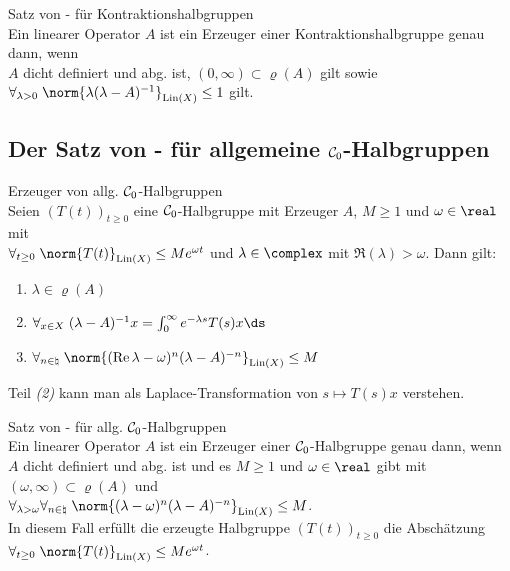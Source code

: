 \linie

\begin{Satz}{Satz von - für Kontraktionshalbgruppen}\\
    Ein linearer Operator $A$ ist ein Erzeuger einer Kontraktionshalbgruppe genau dann, wenn\\
    $A$ dicht definiert und abg. ist,
    $(0, \infty) \subset \varrho(A)$ gilt sowie
    $\forall_{\lambda > 0}\; \norm{\lambda (\lambda-A)^{-1}}_{\Lin(X)} \le 1$ gilt.
\end{Satz}

\pagebreak

\subsection{%
    Der Satz von - für allgemeine \texorpdfstring{$\mathcal{C}_0$}{C₀}-Halbgruppen%
}

\begin{Satz}{Erzeuger von allg. $\mathcal{C}_0$-Halbgruppen}\\
    Seien $(T(t))_{t \ge 0}$ eine $\mathcal{C}_0$-Halbgruppe mit Erzeuger $A$,
    $M \ge 1$ und $\omega \in \real$ mit\\
    $\forall_{t \ge 0}\; \norm{T(t)}_{\Lin(X)} \le M e^{\omega t}$ und
    $\lambda \in \complex$ mit $\Re(\lambda) > \omega$.
    Dann gilt:
    \begin{enumerate}
        \item
        $\lambda \in \varrho(A)$
        
        \item
        $\forall_{x \in X}\; (\lambda-A)^{-1} x = \int_0^\infty e^{-\lambda s} T(s) x \ds$
        
        \item
        $\forall_{n \in \natural}\;
        \norm{(\Re \lambda - \omega)^n (\lambda-A)^{-n}}_{\Lin(X)} \le M$
    \end{enumerate}
\end{Satz}

\begin{Bem}
    Teil \emph{(2)} kann man als Laplace-Transformation von $s \mapsto T(s) x$ verstehen.
\end{Bem}

\linie

\begin{Satz}{Satz von - für allg. $\mathcal{C}_0$-Halbgruppen}\\
    Ein linearer Operator $A$ ist ein Erzeuger einer $\mathcal{C}_0$-Halbgruppe genau dann, wenn\\
    $A$ dicht definiert und abg. ist und
    es $M \ge 1$ und $\omega \in \real$ gibt mit
    $(\omega, \infty) \subset \varrho(A)$ und\\
    $\forall_{\lambda > \omega} \forall_{n \in \natural}\;
    \norm{(\lambda - \omega)^n (\lambda-A)^{-n}}_{\Lin(X)} \le M$.\\
    In diesem Fall erfüllt die erzeugte Halbgruppe $(T(t))_{t \ge 0}$ die Abschätzung\\
    $\forall_{t \ge 0}\; \norm{T(t)}_{\Lin(X)} \le M e^{\omega t}$.
\end{Satz}


